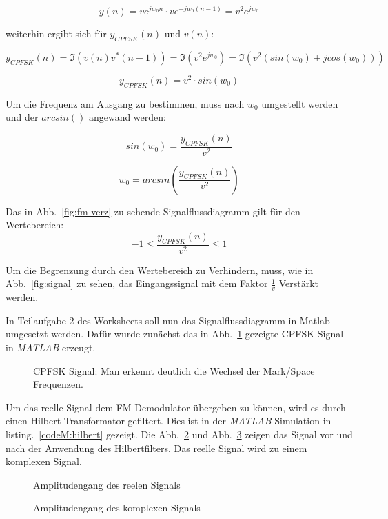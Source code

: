 \documentclass{article}
\begin{document}
$$
y(n) = v e^{j w_0 n} \cdot v e^{-j w_0 (n-1)} = v^2 e^{j w_0}
$$

weiterhin ergibt sich für $y_{CPFSK}(n)$ und $v(n)$:

$$
y_{CPFSK}(n) = \Im(v(n) v^\ast(n-1)) = \Im( v^2 e^{j w_0}) = \Im(v^2 (sin(w_0) + j cos(w_0)))
$$

$$
y_{CPFSK}(n) = v^2 \cdot sin(w_0)
$$

Um die Frequenz am Ausgang zu bestimmen, muss nach $w_0$ umgestellt werden und der $arcsin()$ angewand werden:

$$
sin(w_0) = \frac{y_{CPFSK}(n)}{v^2}
$$

$$
w_0 = arcsin(\frac{y_{CPFSK}(n)}{v^2})
$$

Das in Abb.~\ref{fig:fm-verz} zu sehende Signalflussdiagramm gilt für den Wertebereich:
$$
-1 \leq  \frac{y_{CPFSK}(n)}{v^2} \leq 1
$$

Um die Begrenzung durch den Wertebereich zu Verhindern, muss, wie in Abb.~\ref{fig:signal} zu sehen, 
das Eingangssignal mit dem Faktor $\frac{1}{v}$ Verstärkt werden.

In Teilaufgabe 2 des Worksheets soll nun das Signalflussdiagramm in Matlab umgesetzt werden.
Dafür wurde zunächst das in Abb.~\ref{fig:cpfsk} gezeigte CPFSK Signal in \textit{MATLAB} erzeugt.


\begin{figure}[!h]
    \centering
    \def\svgscale{0.5}
    \def\svgwidth{0.8\columnwidth}
%    
    \caption{CPFSK Signal: Man erkennt deutlich die Wechsel der Mark/Space Frequenzen.}
    \label{fig:cpfsk}
\end{figure}

Um das reelle Signal dem FM-Demodulator übergeben zu können, wird es durch einen Hilbert-Transformator gefiltert.
Dies ist in der \textit{MATLAB} Simulation in listing.~\ref{codeM:hilbert} gezeigt. Die  Abb.~\ref{fig:hilbert_vor} und Abb.~\ref{fig:hilbert_nach} zeigen das Signal vor und nach 
der Anwendung des Hilbertfilters. Das reelle Signal wird zu einem komplexen Signal. 

\begin{figure}[!h]
    \centering
    \def\svgscale{0.5}
    \def\svgwidth{0.8\columnwidth}
%    
    \caption{Amplitudengang des reelen Signals}
    \label{fig:hilbert_vor}
\end{figure}

\begin{figure}[!h]
    \centering
    \def\svgscale{0.5}
    \def\svgwidth{0.8\columnwidth}
%    
    \caption{Amplitudengang des komplexen Signals}
    \label{fig:hilbert_nach}
\end{figure}
\end{document}
